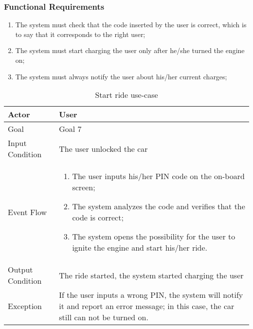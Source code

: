 \subsubsection{Functional Requirements}
\begin{enumerate}
\item The system must check that the code inserted by the user is correct, which is to say that it corresponds to the right user;
\item The system must start charging the user only after he/she turned the engine on;
\item The system must always notify the user about his/her current charges;
\end{enumerate}

\begin{table}[H]
\begin{center}
\begin{tabular}{p{} | p{}}
\hline
Actor & User\\
\hline
Goal & Goal 7\\
\hline
Input Condition & The user unlocked the car\\
\hline
Event Flow & 
\begin{enumerate}
\item The user inputs his/her PIN code on the on-board screen;
\item The system analyzes the code and verifies that the code is correct;
\item The system opens the possibility for the user to ignite the engine and start his/her ride.
\end{enumerate} \\
\hline
Output Condition & The ride started, the system started charging the user\\
\hline
Exception & If the user inputs a wrong PIN, the system will notify it and report an error message; in this case, the car still can not be turned on.\\
\hline
\end{tabular}
\end{center}
\caption{Start ride use-case}
\label{start_ride_uc}
\end{table}